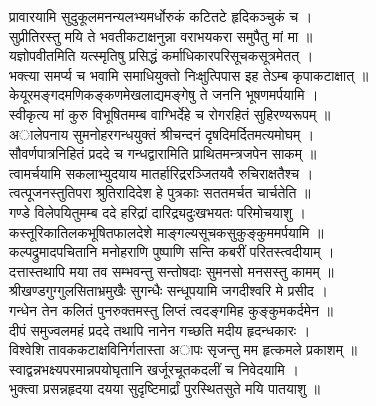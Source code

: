 प्रावारयामि सुदुकूलमनन्यलभ्यमर्धोरुकं कटितटे हृदिकञ्चुकं च ।\\
सुप्रीतिरस्तु मयि ते भवतीकटाक्षनुन्ना वराभयकरा समुपैतु मां मा ॥\\[10pt]

यज्ञोपवीतमिति यत्स्मृतिषु प्रसिद्धं कर्माधिकारपरिसूचकसूत्रमेतत् ।\\
भक्त्या समर्प्य च भवामि समाधियुक्तो निःक्षुत्पिपास इह तेऽम्ब कृपाकटाक्षात् ॥\\[10pt]

केयूरमङ्गदमणिकङ्कणमेखलाद्यमङ्गेषु ते जननि भूषणमर्पयामि ।\\
स्वीकृत्य मां कुरु विभूषितमम्ब वाग्भिर्देहे च रोगरहितं सुहिरण्यरूपम् ॥\\[10pt]

अालेपनाय सुमनोहरगन्धयुक्तं श्रीचन्दनं दृषदिमर्दितमत्यमोघम् ।\\
सौवर्णपात्रनिहितं प्रददे च गन्धद्वारामिति प्राथितमन्त्रजपेन साकम् ॥\\[10pt]

त्वामर्चयामि सकलाभ्युदयाय मातर्हारिद्ररञ्जितयवै रुचिराक्षतैश्च ।\\
त्वत्पूजनस्तुतिपरा श्रुतिरादिदेश हे पुत्रकाः सततमर्चत चार्चतेति ॥\\[10pt]

गण्डे विलेपयितुमम्ब ददे हरिद्रां दारिद्र्यदुःखभयतः परिमोचयाशु ।\\
कस्तूरिकातिलकभूषितफालदेशे माङ्गल्यसूचकसुकुङ्कुममर्पयामि ॥\\[10pt]

कल्पद्रुमादपचितानि मनोहराणि पुष्पाणि सन्ति कबरीं परितस्त्वदीयाम् ।\\
दत्तास्तथापि मया तव सम्भवन्तु सन्तोषदाः सुमनसो मनसस्तु कामम् ॥\\[10pt]

श्रीखण्डगुग्गुलसिताभ्रमुखैः सुगन्धैः सन्धूपयामि जगदीश्वरि मे प्रसीद ।\\
गन्धेन तेन कलितं पुनरुक्तमस्तु लिप्तं त्वदङ्गमिह कुङ्कुमकर्दमेन ॥\\[10pt]

दीपं समुज्वलमहं प्रददे तथापि नानेन गच्छति मदीय हृदन्धकारः ।\\
विश्वेशि तावककटाक्षविनिर्गतास्ता अापः सृजन्तु मम हृत्कमले प्रकाशम् ॥\\[10pt]

स्वाद्वन्नभक्ष्यपरमान्नपयोघृतानि खर्जूरचूतकदलीं च निवेदयामि ।\\
भुक्त्वा प्रसन्नहृदया दयया सुदृष्टिमार्द्रां पुरस्थितसुते मयि पातयाशु ॥\\[10pt]

